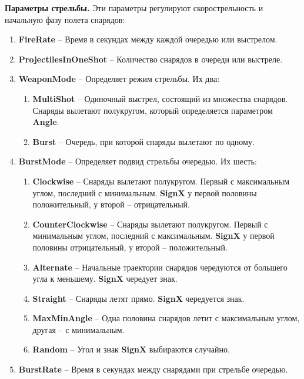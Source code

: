 \textbf{Параметры стрельбы.} Эти параметры регулируют скорострельность и начальную фазу полета снарядов:
\begin{enumerate}
    \item {\small \textbf{FireRate}} -- Время в секундах между каждой очередью или выстрелом.
    \item {\small \textbf{ProjectilesInOneShot}} -- Количество снарядов в очереди или выстреле.
    \item {\small \textbf{WeaponMode}} -- Определяет режим стрельбы. Их два:
    \begin{enumerate}[label=\textbullet]
        \item {\small \textbf{MultiShot}} -- Одиночный выстрел, состоящий из множества снарядов. Снаряды вылетают полукругом, который определяется параметром {\small \textbf{Angle}}.
        \item {\small \textbf{Burst}} -- Очередь, при которой снаряды вылетают по одному.
    \end{enumerate}
    \item {\small \textbf{BurstMode}} -- Определяет подвид стрельбы очередью. Их шесть:
    \begin{enumerate}[label=\textbullet]
        \item {\small \textbf{Clockwise}} -- Снаряды вылетают полукругом. Первый с максимальным углом, последний с минимальным. {\small \textbf{SignX}} у первой половины положительный, у второй -- отрицательный.
        \item {\small \textbf{CounterClockwise}} -- Снаряды вылетают полукругом. Первый с минимальным углом, последний с максимальным. {\small \textbf{SignX}} у первой половины отрицательный, у второй -- положительный.
        \item {\small \textbf{Alternate}} -- Начальные траектории снарядов чередуются от большего угла к меньшему. {\small \textbf{SignX}} чередует знак.
        \item {\small \textbf{Straight}} -- Снаряды летят прямо. {\small \textbf{SignX}} чередуется знак.
        \item {\small \textbf{MaxMinAngle}} -- Одна половина снарядов летит с максимальным углом, другая -- с минимальным.
        \item {\small \textbf{Random}} -- Угол и знак {\small \textbf{SignX}} выбираются случайно.
    \end{enumerate}
    \item {\small \textbf{BurstRate}} -- Время в секундах между снарядами при стрельбе очередью.
\end{enumerate}

